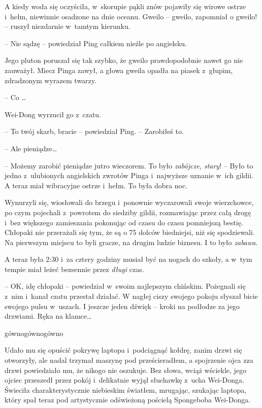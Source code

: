 \documentclass[oneside,polish,11pt,rmheadings]{mwbk}
\begin{document}
A kiedy woda się oczyściła, w~skorupie pąkli znów pojawiły się wirowe ostrze i~hełm, niewinnie osadzone na dnie oceanu. Gweilo -- gweilo, zapomniał o gweilo! -- ruszył niezdarnie w~tamtym kierunku. 


-- Nie sądzę -- powiedział Ping całkiem nieźle po angielsku. 

Jego pluton poruszał się tak szybko, że gweilo prawdopodobnie nawet go nie zauważył. Miecz Pinga zawył, a głowa gweila opadła na piasek z~głupim, zdradzonym wyrazem twarzy. 


-- Co \ldots  


Wei-Dong wyrzucił go z~czatu. 


-- To twój skarb, bracie -- powiedział Ping. -- Zarobiłeś to.  


-- Ale pieniądze\ldots   


-- Możemy zarobić pieniądze jutro wieczorem. To było \textit{zabójcze, stary}! -- Było to jedno z~ulubionych angielskich zwrotów Pinga i~najwyższe uznanie w~ich gildii. A teraz miał wibracyjne ostrze i~hełm. To była dobra noc. 


Wynurzyli się, wiosłowali do brzegu i~ponownie wyczarowali swoje wierzchowce, po czym pojechali z~powrotem do siedziby gildii, rozmawiając przez całą drogę i~bez większego zamieszania pokonując od czasu do czasu pomniejszą bestię. Chłopaki nie przerażali się tym, że są o 75 dolców biedniejsi, niż się spodziewali. Na pierwszym miejscu to byli gracze, na drugim ludzie biznesu. I to było \textit{zabawa}. 


A teraz była 2:30 i~za cztery godziny musiał być na nogach do szkoły, a w~tym tempie miał leżeć bezsennie przez \textit{długi }czas. 

-- OK, idę chłopaki -- powiedział w~swoim najlepszym chińskim. Pożegnali się z~nim i~kanał czatu przestał działać. W nagłej ciszy swojego pokoju słyszał bicie swojego pulsu w~uszach. I jeszcze jeden dźwięk -- kroki na podłodze za jego drzwiami. Ręka na klamce\ldots  


gównogównogówno


Udało mu się opuścić pokrywę laptopa i~podciągnąć kołdrę, zanim drzwi się otworzyły, ale nadal trzymał maszynę pod prześcieradłem, a spojrzenie ojca zza drzwi powiedziało mu, że nikogo nie oszukuje. Bez słowa, wciąż wściekle, jego ojciec przeszedł przez pokój i~delikatnie wyjął słuchawkę z~ucha Wei-Donga. Świeciła charakterystycznie niebieskim światłem, mrugając, szukając laptopa, który spał teraz pod artystycznie odświeżoną pościelą Spongeboba Wei-Donga. 
\end{document}

